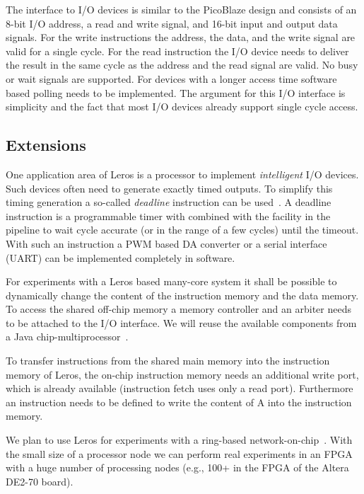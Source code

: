 \documentclass[a4paper,fontsize=10pt,twoside,DIV15,BCOR12mm,headinclude=true,footinclude=false,pagesize,bibtotoc]{scrbook}
\begin{document}
The interface to I/O devices is similar to the PicoBlaze design and consists of an 8-bit I/O address, a read and write signal, and 16-bit input and output data signals. For the write instructions the address, the data, and the write signal are valid for a single cycle. For the read instruction the I/O device needs to deliver the result in the same cycle as the address and the read signal are valid. No busy or wait signals are supported. For devices with a longer access time software based polling needs to be implemented. The argument for this I/O interface is simplicity and the fact that most I/O devices already support single cycle access.


\subsection{Extensions}

One application area of Leros is a processor to implement \emph{intelligent} I/O devices. Such devices often need to generate exactly timed outputs. To simplify this timing generation a so-called \emph{deadline} instruction can be used~\cite{Edwards:06:deadline, jop:deadline}. A deadline instruction is a programmable timer with combined with the facility in the pipeline to wait cycle accurate (or in the range of a few cycles) until the timeout. With such an instruction a PWM based DA converter or a serial interface (UART) can be implemented completely in software.

For experiments with a Leros based many-core system it shall be possible to dynamically change the content of the instruction memory and the data memory. To access the shared off-chip memory a memory controller and an arbiter needs to be attached to the I/O interface. We will reuse the available components from a Java chip-multiprocessor~\cite{jop:tecs:cmp}.

To transfer instructions from the shared main memory into the instruction memory of Leros, the on-chip instruction memory needs an additional write port, which is already available (instruction fetch uses only a read port). Furthermore an instruction needs to be defined to write the content of A into the instruction memory.

We plan to use Leros for experiments with a ring-based network-on-chip~\cite{jop:csp}. With the small size of a processor node we can perform real experiments in an FPGA with a huge number of processing nodes (e.g., 100+ in the FPGA of the Altera DE2-70 board).
\end{document}
